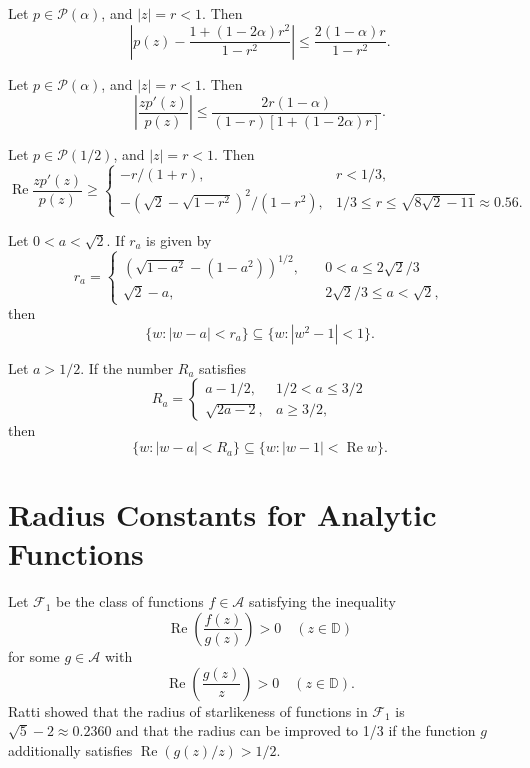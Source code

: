 \documentclass{amsart}
\begin{document}
\begin{lemma}\label{lm5}{\rm\cite{vraviron}}
Let $p\in\mathcal{P}(\alpha)$, and $|z|=r<1$. Then
\[\left|p(z)-\frac{1+(1-2{\alpha})r^2}{1-r^2}\right|\leq\frac{2(1-{\alpha})r}{1-r^2}  .\]
\end{lemma}

\begin{lemma}\label{lm3}{\rm\cite{shah}}
Let $p\in\mathcal{P}(\alpha)$, and $|z|=r<1$. Then
\[\left|\frac{zp'(z)}{p(z)}\right|\leq\frac{2r(1-\alpha)}{(1-r)[1+(1-2\alpha)r]} .\]
\end{lemma}

\begin{lemma}\label{lm7}{\rm \cite[Lemma 2.4]{causey}}
Let $p\in\mathcal{P}(1/2)$, and $|z|=r<1$. Then
\[\operatorname{Re} \frac{zp'(z)}{p(z)} \geq\begin{cases}
 - r/(1+r), &  r< 1/3,\\
 - (\sqrt{2}-\sqrt{1-r^2})^2/(1-r^2), &  1/3 \leq r\leq \sqrt{8\sqrt{2}-11}\approx0.56.\end{cases}
 \]
\end{lemma}

\begin{lemma}\label{lm4}{\rm\cite{nav}}  Let $0 < a< \sqrt{2}$. If  $r_a$ is given by
\[ r_a= \begin{cases} \left(\sqrt{1-a^2}-(1-a^2)\right)^{1/2}, &\quad  0 <a \leq 2 \sqrt{2}/3 \\
\sqrt{2}-a, & \quad 2 \sqrt{2}/3 \leq a <\sqrt{2},
\end{cases} \]  
then  \[ \{ w: |w-a|< r_a\} \subseteq \{w: |w^2-1|<1\}.\] 
\end{lemma}

\begin{lemma}\label{lm6}{\rm\cite{vravicmft}} Let $a> 1/2$. If the number $R_a$ satisfies
\[R_a=\begin{cases}
a- 1/2, &  1/2 < a  \leq  3/2  \\
\sqrt{2a-2}, & a \geq  3/2 ,
\end{cases} \]
then  \[ \{ w: |w-a|< R_a\} \subseteq \{w: |w-1|<\operatorname{Re} w\}. \]
\end{lemma}

\section{Radius Constants for Analytic Functions}
Let $\mathcal{F}_1$ be the class of functions $f\in \mathcal{A}$ satisfying the inequality
\[ \operatorname{Re}\left(\frac{f(z)}{g(z)}\right)>0\quad (z\in \mathbb{D})\]
for some $g\in \mathcal{A}$ with \[ \operatorname{Re} \left(\frac{g(z)}{z}\right)>0\quad (z\in \mathbb{D}).\] Ratti \cite{ratti68} showed that the radius of starlikeness of functions in $\mathcal{F}_1$  is $\sqrt{5}-2\approx 0.2360$ and that the radius can be improved to 1/3 if the function $g$ additionally satisfies $\operatorname{Re}(g(z)/z)>1/2$.
\end{document}
